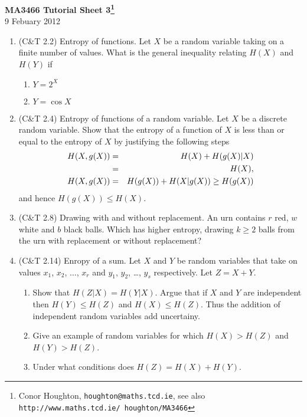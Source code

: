 \documentclass[12pt]{article}
\begin{document}
\begin{center}
{\bf MA3466 Tutorial Sheet 3\footnote{Conor Houghton, {\tt houghton@maths.tcd.ie}, see also {\tt http://www.maths.tcd.ie/ houghton/MA3466}}}\\[1cm]{} 9 Febuary 2012
\end{center}
\begin{enumerate}

\item (C\&T 2.2) Entropy of functions. Let $X$ be a random variable taking on a finite number of values. What is the general inequality relating $H(X)$ and $H(Y)$ if 
\begin{enumerate}
\item $Y=2^X$
\item $Y=\cos{X}$
\end{enumerate}

\item (C\&T 2.4) Entropy of functions of a random variable. Let $X$ be a discrete random variable. Show that the entropy of a function of $X$ is less than or equal to the entropy of $X$ by justifying the following steps
\begin{eqnarray}
H(X,g(X))&=&H(X)+H(g(X)|X)\cr
         &=&H(X),\cr
H(X,g(X))&=&H(g(X))+H(X|g(X))\ge H(g(X))
\end{eqnarray}
and hence $H(g(X))\le H(X)$.

\item (C\&T 2.8) Drawing with and without replacement. An urn contains
$r$ red, $w$ white and $b$ black balls. Which has higher entropy,
drawing $k\ge 2$ balls from the urn with replacement or without
replacement?

\item (C\&T 2.14) Enropy of a sum. Let $X$ and $Y$ be random variables that take on values $x_1$, $x_2$, $\ldots$, $x_r$ and $y_1$, $y_2$, \ldots, $y_s$ respectively. Let $Z=X+Y$.
\begin{enumerate}
\item Show that $H(Z|X)=H(Y|X)$. Argue that if $X$ and $Y$ are independent then $H(Y)\le H(Z)$ and $H(X)\le H(Z)$. Thus the addition of independent random variables add uncertainy.
\item Give an example of random variables for which $H(X)>H(Z)$ and $H(Y)>H(Z)$.
\item Under what conditions does $H(Z)=H(X)+H(Y)$.
\end{enumerate}


\end{enumerate}
\end{document}
